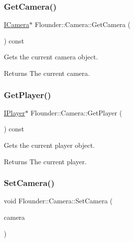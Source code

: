 \subsubsection{\texorpdfstring{Get\+Camera()}{GetCamera()}}
{\footnotesize\ttfamily \hyperlink{class_flounder_1_1_i_camera}{I\+Camera}$\ast$ Flounder\+::\+Camera\+::\+Get\+Camera (\begin{DoxyParamCaption}{ }\end{DoxyParamCaption}) const\hspace{0.3cm}{\ttfamily [inline]}}



Gets the current camera object. 

\begin{DoxyReturn}{Returns}
The current camera. 
\end{DoxyReturn}
\mbox{\label{class_flounder_1_1_camera_a7eef198b45ea2a46f72840a4140de8b5}} 
\subsubsection{\texorpdfstring{Get\+Player()}{GetPlayer()}}
{\footnotesize\ttfamily \hyperlink{class_flounder_1_1_i_player}{I\+Player}$\ast$ Flounder\+::\+Camera\+::\+Get\+Player (\begin{DoxyParamCaption}{ }\end{DoxyParamCaption}) const\hspace{0.3cm}{\ttfamily [inline]}}



Gets the current player object. 

\begin{DoxyReturn}{Returns}
The current player. 
\end{DoxyReturn}
\mbox{\label{class_flounder_1_1_camera_a232b98e6afdab6749cfa9ac3625f2c49}} 
\subsubsection{\texorpdfstring{Set\+Camera()}{SetCamera()}}
{\footnotesize\ttfamily void Flounder\+::\+Camera\+::\+Set\+Camera (\begin{DoxyParamCaption}\item[{\hyperlink{class_flounder_1_1_i_camera}{I\+Camera} $\ast$}]{camera }\end{DoxyParamCaption})\hspace{0.3cm}{\ttfamily [inline]}}



